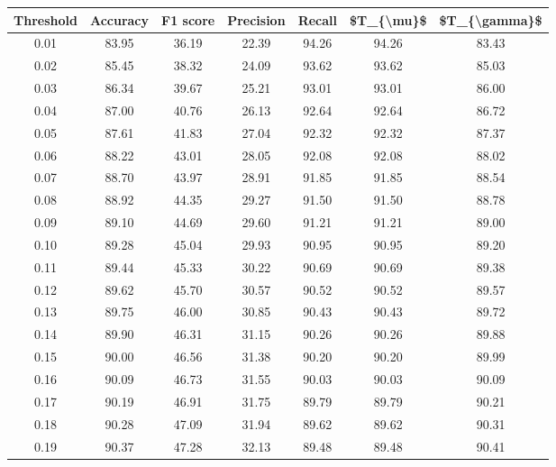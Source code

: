 \begin{tabular}{|c|c|c|c|c|c|c|}
\hline
 Threshold &  Accuracy &  F1 score &  Precision &  Recall &  \$T\_\{\textbackslash mu\}\$ &  \$T\_\{\textbackslash gamma\}\$ \\
\hline
      0.01 &     83.95 &     36.19 &      22.39 &   94.26 &      94.26 &         83.43 \\
      0.02 &     85.45 &     38.32 &      24.09 &   93.62 &      93.62 &         85.03 \\
      0.03 &     86.34 &     39.67 &      25.21 &   93.01 &      93.01 &         86.00 \\
      0.04 &     87.00 &     40.76 &      26.13 &   92.64 &      92.64 &         86.72 \\
      0.05 &     87.61 &     41.83 &      27.04 &   92.32 &      92.32 &         87.37 \\
      0.06 &     88.22 &     43.01 &      28.05 &   92.08 &      92.08 &         88.02 \\
      0.07 &     88.70 &     43.97 &      28.91 &   91.85 &      91.85 &         88.54 \\
      0.08 &     88.92 &     44.35 &      29.27 &   91.50 &      91.50 &         88.78 \\
      0.09 &     89.10 &     44.69 &      29.60 &   91.21 &      91.21 &         89.00 \\
      0.10 &     89.28 &     45.04 &      29.93 &   90.95 &      90.95 &         89.20 \\
      0.11 &     89.44 &     45.33 &      30.22 &   90.69 &      90.69 &         89.38 \\
      0.12 &     89.62 &     45.70 &      30.57 &   90.52 &      90.52 &         89.57 \\
      0.13 &     89.75 &     46.00 &      30.85 &   90.43 &      90.43 &         89.72 \\
      0.14 &     89.90 &     46.31 &      31.15 &   90.26 &      90.26 &         89.88 \\
      0.15 &     90.00 &     46.56 &      31.38 &   90.20 &      90.20 &         89.99 \\
      0.16 &     90.09 &     46.73 &      31.55 &   90.03 &      90.03 &         90.09 \\
      0.17 &     90.19 &     46.91 &      31.75 &   89.79 &      89.79 &         90.21 \\
      0.18 &     90.28 &     47.09 &      31.94 &   89.62 &      89.62 &         90.31 \\
      0.19 &     90.37 &     47.28 &      32.13 &   89.48 &      89.48 &         90.41 \\

\end{tabular}
